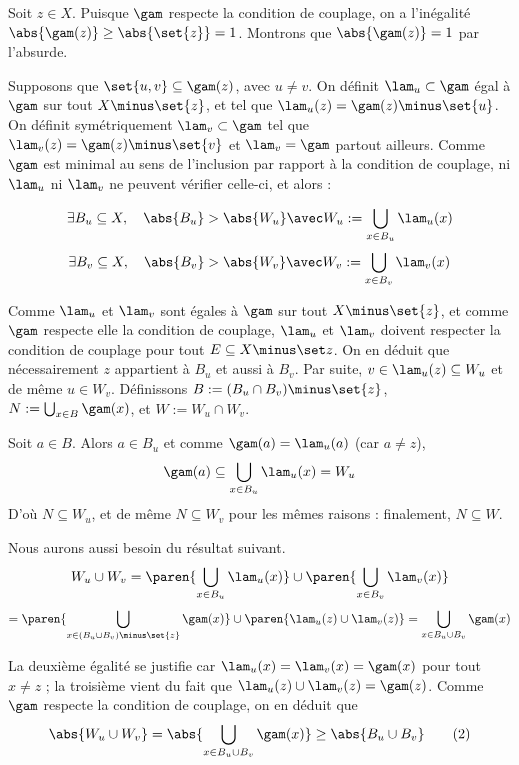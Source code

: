     Soit $z \in X$. Puisque $\gam$ respecte la condition de couplage, on a l'inégalité $\abs {\gam(z)} \geq \abs{\set{z}} = 1$.   Montrons que $\abs{\gam(z)} = 1$ par l'absurde.
    
    Supposons que $\set{u,v} \subseteq \gam(z)$, avec $u \neq v$. On définit $\lam_u \subset \gam$ égal à $\gam$ sur tout $X \minus \set{z}$, et tel que $\lam_u(z) = \gam(z) \minus \set{u}$. On définit symétriquement $\lam_v \subset \gam$ tel que $\lam_v(z) = \gam(z) \minus \set{v}$ et $\lam_v = \gam$ partout ailleurs. Comme $\gam$ est minimal au sens de l'inclusion par rapport à la condition de couplage, ni $\lam_u$ ni $\lam_v$ ne peuvent vérifier celle-ci, et alors :
    
    \[ \exists B_u \subseteq X, \quad \abs{B_u} > \abs{W_u} \avec W_u := \bigcup_{x \in B_u} \lam_u(x) \]
    \[ \exists B_v \subseteq X, \quad \abs{B_v} > \abs{W_v} \avec W_v := \bigcup_{x \in B_v} \lam_v(x) \]
    
    Comme $\lam_u$ et $\lam_v$ sont égales à $\gam$ sur tout $X \minus \set{z}$, et comme $\gam$ respecte elle la condition de couplage, $\lam_u$ et $\lam_v$ doivent respecter la condition de couplage pour tout $E \subseteq X \minus \set z$. On en déduit que nécessairement $z$ appartient à $B_u$ et aussi à $B_v$. Par suite, $v \in \lam_u(z) \subseteq W_u $ et de même $u \in W_v$. Définissons $B := (B_u \cap B_v) \minus \set{z}$, $N := \bigcup _{x \in B} \gam (x)$, et $W := W_u \cap W_v$.
    
    Soit $a \in B$. Alors $a \in B_u$ et comme $\gam(a) = \lam_u(a)$ (car $a \neq z$),
    \[ \gam(a) \subseteq  \bigcup_{x \in B_u} \lam_u(x) = W_u \]
    D'où $N \subseteq W_u$, et de même $N \subseteq W_v$ pour les mêmes raisons : finalement, $N \subseteq W$.
    
    Nous aurons aussi besoin du résultat suivant.
    \[ W_u \cup W_v = \paren { \bigcup_{x \in B_u} \lam_u(x) } \cup \paren{ \bigcup_{x \in B_v} \lam_v(x) }
    \]
    \[ = \paren{ \bigcup_{x \in (B_u \cup B_v) \minus \set{z} } \gam(x) } \cup \paren { \lam_u(z) \cup \lam_v(z) }
    = \bigcup_{x \in B_u \cup B_v } \gam(x) \]
    
    La deuxième égalité se justifie car $\lam_u(x) = \lam_v(x) = \gam(x)$ pour tout $x \neq z$ ; la troisième vient du fait que $\lam_u(z) \cup \lam_v(z) = \gam(z)$. Comme $\gam$ respecte la condition de couplage, on en déduit que
    \[ \abs{W_u \cup W_v} = \abs{\bigcup_{x \in B_u \cup B_v } \gam(x)} \geq \abs{B_u \cup B_v} \tag{2} \]
    
